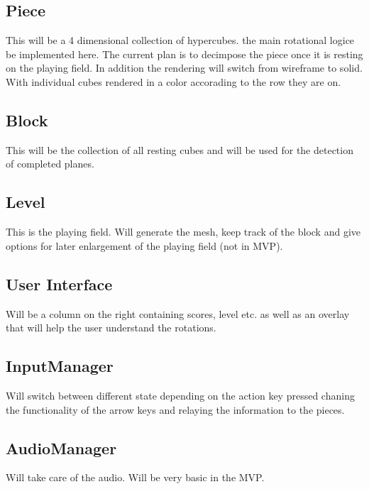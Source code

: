 \documentclass{article}
\begin{document}
\subsection{Piece}
This will be a 4 dimensional collection of hypercubes. the main rotational logice be implemented here. The current plan is to decimpose the piece once it is resting on the playing field. In addition the rendering will switch from wireframe to solid. With individual cubes rendered in a color accorading to the row they are on.
\subsection{Block}
This will be the collection of all resting cubes and will be used for the detection of completed planes.
\subsection{Level}
This is the playing field. Will generate the mesh, keep track of the block and give options for later enlargement of the playing field (not in MVP).
\subsection{User Interface}
Will be a column on the right containing scores, level etc. as well as an overlay that will help the user understand the rotations.
\subsection{InputManager}
Will switch between different state depending on the action key pressed chaning the functionality of the arrow keys and relaying the information to the pieces.
\subsection{AudioManager}
Will take care of the audio. Will be very basic in the MVP.

\end{document}
